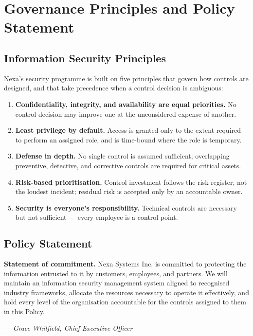\section{Governance Principles and Policy Statement}

\subsection{Information Security Principles}
Nexa's security programme is built on five principles that govern how controls are
designed, and that take precedence when a control decision is ambiguous:

\begin{enumerate}[topsep=2pt, itemsep=3pt, label=\textbf{P\arabic*.}]
  \item \textbf{Confidentiality, integrity, and availability are equal priorities.} No
        control decision may improve one at the unconsidered expense of another.
  \item \textbf{Least privilege by default.} Access is granted only to the extent required
        to perform an assigned role, and is time-bound where the role is temporary.
  \item \textbf{Defense in depth.} No single control is assumed sufficient; overlapping
        preventive, detective, and corrective controls are required for critical assets.
  \item \textbf{Risk-based prioritisation.} Control investment follows the risk register,
        not the loudest incident; residual risk is accepted only by an accountable owner.
  \item \textbf{Security is everyone's responsibility.} Technical controls are necessary
        but not sufficient --- every employee is a control point.
\end{enumerate}

\subsection{Policy Statement}
\begin{policyquote}
  \textbf{Statement of commitment.} Nexa Systems Inc. is committed to protecting the
  information entrusted to it by customers, employees, and partners. We will maintain an
  information security management system aligned to recognised industry frameworks,
  allocate the resources necessary to operate it effectively, and hold every level of the
  organisation accountable for the controls assigned to them in this Policy.

  \hfill --- \textit{Grace Whitfield, Chief Executive Officer}
\end{policyquote}

